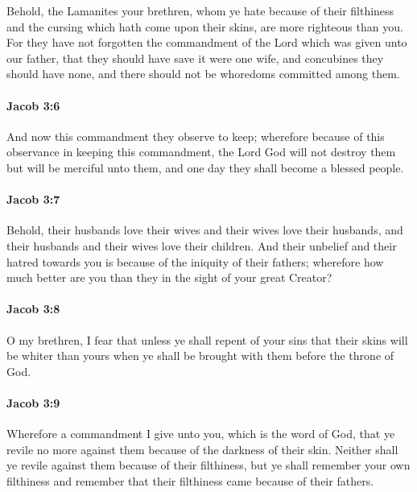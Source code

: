 			Behold, the Lamanites your brethren, whom ye hate
			because of their filthiness and the cursing which hath come upon their skins,
			are more righteous than you.
			For they have not forgotten the commandment of the Lord
			which was given unto our father,
			that they should have save it were one wife,
			and concubines they should have none,
			and there should not be whoredoms committed among them.

		\paragraph{Jacob 3:6} %
			\label{JACOB-3-6}

			And now this commandment they observe to keep;
			wherefore because of this observance in keeping this commandment,
			the Lord God will not destroy them but will be merciful unto them,
			and one day they shall become a blessed people.

		\paragraph{Jacob 3:7} %
			\label{JACOB-3-7}

			Behold, their husbands love their wives
			and their wives love their husbands,
			and their husbands and their wives love their children.
			And their unbelief and their hatred towards you
			is because of the iniquity of their fathers;
			wherefore how much better are you than they
			in the sight of your great Creator?

		\paragraph{Jacob 3:8} %
			\label{JACOB-3-8}

			O my brethren, I fear that unless ye shall repent of your sins
			that their skins will be whiter than yours
			when ye shall be brought with them before the throne of God.

		\paragraph{Jacob 3:9} %
			\label{JACOB-3-9}

			Wherefore a commandment I give unto you, which is the word of God,
			that ye revile no more against them because of the darkness of their skin.
			Neither shall ye revile against them because of their filthiness,
			but ye shall remember your own filthiness
			and remember that their filthiness came because of their fathers.

